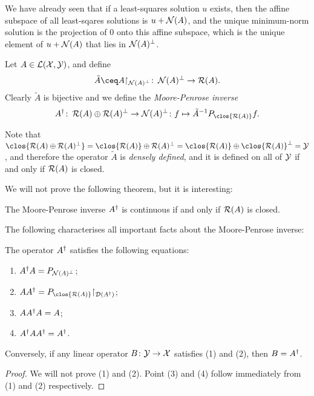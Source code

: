 We have already seen that if a least-squares solution $u$ exists, then the affine subspace of all least-sqares solutions is $u + \operatorname{\mathcal N}(A)$, and the unique minimum-norm solution is the projection of 0 onto this affine subspace, which is the unique element of $u + \operatorname{\mathcal N}(A)$ that lies in $\operatorname{\mathcal N}(A)^\perp$. 

\begin{definition}
    Let $A \in \mathcal L(\mathcal X, \mathcal Y)$, and define
    \[
    \tilde A \ceq A \restr_{\Nul(A)\P} \colon \Nul(A)\P \to \Ran(A). 
    \]
    Clearly $\tilde A$ is bijective and we define the \emph{Moore-Penrose inverse} 
    \[
    A\D \colon \Ran(A) \oplus \Ran(A)\P \to \Nul(A)\P \colon f \mapsto \tilde A^{-1} P_{\clos{\Ran(A)}} f. 
    \]
\end{definition}

\begin{remark}
    Note that $\clos{\Ran(A) \oplus \Ran(A)\P} = \clos{\Ran(A)} \oplus \Ran(A)\P = \clos{\Ran(A)} \oplus \clos{\Ran(A)}\P = \YYY$, and therefore the operator $\tilde A$ is \emph{densely defined}, and it is defined on all of $
    \mathcal Y$ if and only if $\operatorname{\mathcal R}(A)$ is closed. 
\end{remark}

We will not prove the following theorem, but it is interesting: 
\begin{theorem} \label{thm:mp_inverse_continuous}
    The Moore-Penrose inverse $A^\dagger$ is continuous if and only if $\operatorname{\mathcal R}(A)$ is closed. 
\end{theorem}

The following characterises all important facts about the Moore-Penrose inverse: 
\begin{theorem} \label{thm:mp_equations}
    The operator $A^\dagger$ satisfies the following equations: 
    \begin{enumerate}[(1)]
        \item $A^\dagger A = P_{\operatorname{\mathcal N}(A)^\perp}$; 
        \item $AA\D = P_{\clos{\Ran(A)}}\restr_{
        \Dom(A\D)}$; 
        \item $AA^\dagger A = A$;
        \item $A^\dagger AA^\dagger = A^\dagger$. 
    \end{enumerate}

Conversely, if any linear operator $B \colon \mathcal Y \to \mathcal X$ satisfies (1) and (2), then $B = A^\dagger$.  
\end{theorem}

\begin{proof}
    We will not prove (1) and (2). Point (3) and (4) follow immediately from (1) and (2) respectively. 
\end{proof}

